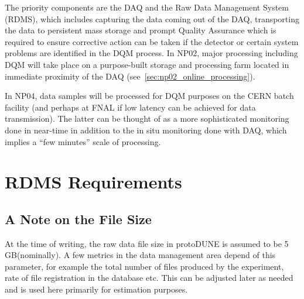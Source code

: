 \documentclass[12pt]{article}
\newcommand{\filesize}{5\,GB\xspace}
\begin{document}
The priority components are the DAQ and the Raw Data Management System (RDMS), which includes capturing the data coming out of the DAQ,
transporting the data to persistent mass storage and prompt Quality Assurance which is required to ensure corrective action can be taken
if the detector or certain system problems are identified in the DQM process. In NP02, major processing including DQM will take place
on a purpose-built storage and processing farm located in immediate proximity of the DAQ (see~\ref{sec:np02_online_processing}).

In NP04, data samples will be processed for DQM purposes on the CERN batch facility (and perhaps at FNAL if low latency can be
achieved for data transmission). The latter can be thought of as a more sophisticated monitoring done in near-time in addition to the in
situ monitoring done with DAQ, which implies a ``few minutes'' scale of processing.


\section{RDMS Requirements}
\subsection{A Note on the File Size}
At the time of writing, the raw data file size in protoDUNE  is assumed to be \filesize (nominally). A few metrics in the data management area depend of this
parameter, for example the total number of files produced by the experiment, rate of file registration in the database etc. This can be adjusted
later as needed and is used here primarily for estimation purposes.
\end{document}
